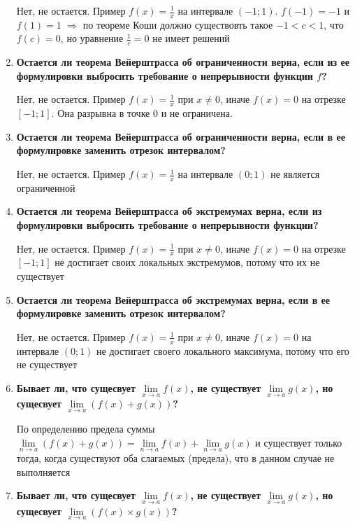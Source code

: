 \documentclass[a4paper,12pt]{article}
\begin{document}
\begin{enumerate}
{      Нет, не остается. Пример $f(x) = \frac{1}{x}$ на интервале $(-1; 1)$. $f(-1) = -1$ и $f(1) = 1$
      $\Rightarrow$ по теореме Коши должно существовть такое $-1 < c < 1$, что $f(c) = 0$, но уравнение
      $\frac{1}{c} = 0$ не имеет решений
    }
    \item {
      \textbf{Остается ли теорема Вейерштрасса об ограниченности верна, если из ее формулировки выбросить требование о непрерывности функции $f$?}

      Нет, не остается. Пример $f(x) = \frac{1}{x}$ при $x \neq 0$, иначе $f(x) = 0$ на отрезке $[-1; 1]$. Она разрывна в точке 0 и не ограничена.
    } 
    \item {
      \textbf{Остается ли теорема Вейерштрасса об ограниченности верна, если в ее формулировке заменить отрезок интервалом?}

      Нет, не остается. Пример $f(x) = \frac{1}{x}$ на интервале $(0; 1)$ не является ограниченной
    } 
    \item {
      \textbf{Остается ли теорема Вейерштрасса об экстремумах верна, если из формулировки выбросить требование о непрерывности функции?}

      Нет, не остается. Пример $f(x) = \frac{1}{x}$ при $x \neq 0$, иначе $f(x) = 0$ на отрезке $[-1; 1]$ не достигает
      своих локальных экстремумов, потому что их не существует
    }
    \item {
      \textbf{Остается ли теорема Вейерштрасса об экстремумах верна, если в ее формулировке заменить отрезок интервалом?}

      Нет, не остается. Пример $f(x) = \frac{1}{x}$ при $x \neq 0$, иначе $f(x) = 0$ на интервале $(0; 1)$ не достигает
      своего локального максимума, потому что его не существует
    }
    \item {
      \textbf{Бывает ли, что сущесвует $\lim\limits_{x \rightarrow a}f(x)$, не существует $\lim\limits_{x \rightarrow a}g(x)$, но сущесвует $\lim\limits_{x \rightarrow a}(f(x) + g(x))$?}

      По определению предела суммы $\lim\limits_{n \rightarrow a}(f(x) + g(x)) = \lim\limits_{n \rightarrow a}f(x) + \lim\limits_{n \rightarrow a}g(x)$
      и существует только тогда, когда существуют оба слагаемых (предела), что в данном случае не выполняется
    }
    \item {
      \textbf{Бывает ли, что сущесвует $\lim\limits_{x \rightarrow a}f(x)$, не существует $\lim\limits_{x \rightarrow a}g(x)$, но сущесвует $\lim\limits_{x \rightarrow a}(f(x) \times g(x))$?}

}
\end{enumerate}
\end{document}
